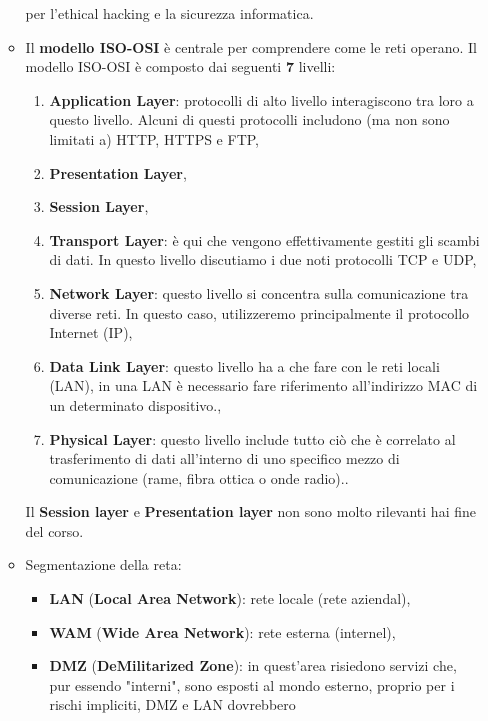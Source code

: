 \documentclass[12pt]{article}
\begin{document}
\begin{enumerate}
\begin{itemize}
        per l'ethical hacking e la sicurezza informatica.
        \item Il \textbf{modello ISO-OSI} \`{e} centrale per comprendere come 
        le reti operano. Il modello ISO-OSI \`{e} composto dai seguenti \textbf{7} 
        livelli:
        \begin{enumerate}
            \item \textbf{Application Layer}: protocolli di alto livello 
            interagiscono tra loro a questo livello. Alcuni di questi protocolli 
            includono (ma non sono limitati a) HTTP, HTTPS e FTP,
            \item \textbf{Presentation Layer},
            \item \textbf{Session Layer},
            \item \textbf{Transport Layer}: \`{e} qui che vengono effettivamente 
            gestiti gli scambi di dati. In questo livello discutiamo i due noti 
            protocolli TCP e UDP,
            \item \textbf{Network Layer}: questo livello si concentra sulla 
            comunicazione tra diverse reti. In questo caso, utilizzeremo 
            principalmente il protocollo Internet (IP),
            \item \textbf{Data Link Layer}: questo livello ha a che fare con le 
            reti locali (LAN), in una LAN \`{e} necessario fare riferimento 
            all'indirizzo MAC di un determinato dispositivo.,
            \item \textbf{Physical Layer}: questo livello include tutto ci\`{o} che 
            \`{e} correlato al trasferimento di dati all'interno di uno specifico 
            mezzo di comunicazione (rame, fibra ottica o onde radio)..
        \end{enumerate} 
        Il \textbf{Session layer} e \textbf{Presentation layer} non sono molto 
        rilevanti hai fine del corso.
        \item Segmentazione della reta:
        \begin{itemize}
            \item \textbf{LAN} (\textbf{Local Area Network}): rete locale (rete 
            aziendal),
            \item \textbf{WAM} (\textbf{Wide Area Network}): rete esterna 
            (internel),
            \item \textbf{DMZ} (\textbf{DeMilitarized Zone}): in quest'area 
            risiedono servizi che, pur essendo "interni", sono esposti al
            mondo esterno, proprio per i rischi impliciti, DMZ e LAN dovrebbero

\end{itemize}
\end{itemize}
\end{enumerate}
\end{document}
